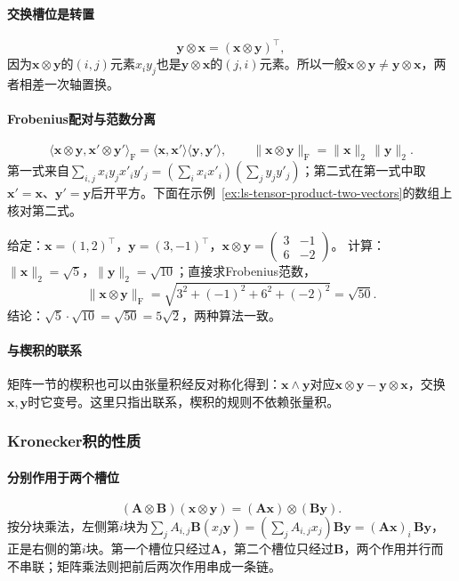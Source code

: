 \paragraph{交换槽位是转置}
\[
 \bm y\otimes\bm x=(\bm x\otimes\bm y)^\top,
\]
因为$\bm x\otimes\bm y$的$(i,j)$元素$x_iy_j$也是$\bm y\otimes\bm x$的$(j,i)$元素。所以一般$\bm x\otimes\bm y\neq\bm y\otimes\bm x$，两者相差一次轴置换。

\paragraph{Frobenius配对与范数分离}
\[
 \langle\bm x\otimes\bm y,\bm x'\otimes\bm y'\rangle_{\mathrm F}
 =\langle\bm x,\bm x'\rangle\langle\bm y,\bm y'\rangle,
 \qquad
 \lVert\bm x\otimes\bm y\rVert_{\mathrm F}=\lVert\bm x\rVert_2\,\lVert\bm y\rVert_2.
\]
第一式来自$\sum_{i,j}x_iy_jx'_iy'_j=(\sum_ix_ix'_i)(\sum_jy_jy'_j)$；第二式在第一式中取$\bm x'=\bm x$、$\bm y'=\bm y$后开平方。下面在示例~\ref{ex:ls-tensor-product-two-vectors}的数组上核对第二式。
\begin{example}[张量积范数的数值核对]
\label{ex:ls-tensor-product-norm-check}
给定：$\bm x=(1,2)^\top$，$\bm y=(3,-1)^\top$，$\bm x\otimes\bm y=\left(\begin{smallmatrix}3&-1\\6&-2\end{smallmatrix}\right)$。
计算：$\lVert\bm x\rVert_2=\sqrt5$，$\lVert\bm y\rVert_2=\sqrt{10}$；直接求Frobenius范数，
\[
 \lVert\bm x\otimes\bm y\rVert_{\mathrm F}=\sqrt{3^2+(-1)^2+6^2+(-2)^2}=\sqrt{50}.
\]
结论：$\sqrt5\cdot\sqrt{10}=\sqrt{50}=5\sqrt2$，两种算法一致。
\end{example}

\paragraph{与楔积的联系}
矩阵一节的楔积也可以由张量积经反对称化得到：$\bm x\wedge\bm y$对应$\bm x\otimes\bm y-\bm y\otimes\bm x$，交换$\bm x,\bm y$时它变号。这里只指出联系，楔积的规则不依赖张量积。

\subsubsection{Kronecker积的性质}
\label{sec:ls-kronecker-products}

\paragraph{分别作用于两个槽位}
\[
 (\bm A\otimes\bm B)(\bm x\otimes\bm y)=(\bm A\bm x)\otimes(\bm B\bm y).
\]
按分块乘法，左侧第$i$块为$\sum_jA_{i,j}\bm B(x_j\bm y)=(\sum_jA_{i,j}x_j)\bm B\bm y=(\bm A\bm x)_i\,\bm B\bm y$，正是右侧的第$i$块。第一个槽位只经过$\bm A$，第二个槽位只经过$\bm B$，两个作用并行而不串联；矩阵乘法则把前后两次作用串成一条链。

